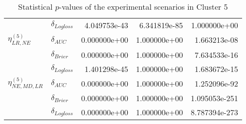 \begin{table}[!h]
\begin{tabular}{l|lrrr}
                              & $\delta_{Logloss}$ &           4.049753e-43 &     6.341819e-85 &             1.000000e+00 \\
    $\eta^{(5)}_{LR, NE}$ & $\delta_{AUC}$ &           0.000000e+00 &     1.000000e+00 &             1.663213e-08 \\
                              & $\delta_{Brier}$ &           0.000000e+00 &     1.000000e+00 &             7.634533e-16 \\
                              & $\delta_{Logloss}$ &           1.401298e-45 &     1.000000e+00 &             1.683672e-15 \\
    $\eta^{(5)}_{NE, MD, LR}$ & $\delta_{AUC}$ &           0.000000e+00 &     1.000000e+00 &             1.252096e-92 \\
                              & $\delta_{Brier}$ &           0.000000e+00 &     1.000000e+00 &            1.095053e-251 \\
                              & $\delta_{Logloss}$ &           0.000000e+00 &     1.000000e+00 &            8.787394e-273 \\
    \bottomrule
    \end{tabular}
    \caption{Statistical $p$-values of the experimental scenarios in Cluster 5}
    \end{table}
    
